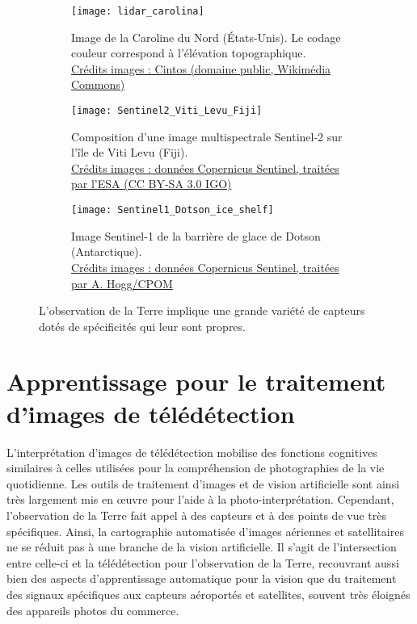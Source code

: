 \begin{figure}[h]
  \captionsetup[subfigure]{width=0.95\linewidth,justification=centering}
  \begin{subfigure}[t]{0.33\textwidth}
    \texttt{[image: lidar\_carolina]}
    \caption{Image  de la Caroline du Nord (États-Unis). Le codage couleur correspond à l'élévation topographique.\\
    \small \href{https://commons.wikimedia.org/wiki/File:Rex,_NC_LiDAR_DEM_of_Carolina_bays.jpg}{Crédits images : Cintos (domaine public, Wikimédia Commons)}
    }
  \end{subfigure}
  \begin{subfigure}[t]{0.33\textwidth}
    \texttt{[image: Sentinel2\_Viti\_Levu\_Fiji]}
    \caption{Composition  d'une image multispectrale Sentinel-2 sur l'île de Viti Levu (Fiji).\\
    \small \href{https://www.esa.int/spaceinimages/Images/2017/11/Viti_Levu_Fiji}{Crédits images : données Copernicus Sentinel, traitées par l'ESA (CC BY-SA 3.0 IGO)}
    }
  \end{subfigure}
  \begin{subfigure}[t]{0.33\textwidth}
    \texttt{[image: Sentinel1\_Dotson\_ice\_shelf]}
    \caption{Image  Sentinel-1 de la barrière de glace de Dotson (Antarctique).\\
    \small \href{https://www.esa.int/spaceinimages/Images/2017/10/Dotson_ice_shelf_from_Sentinel-1}{Crédits images : données Copernicus Sentinel, traitées par A. Hogg/CPOM}
    }
  \end{subfigure}
  \caption{L'observation de la Terre implique une grande variété de capteurs dotés de spécificités qui leur sont propres.}
  \label{fig:earth_observation}
\end{figure}

\section{Apprentissage pour le traitement d'images de télédétection}

L'interprétation d'images de télédétection mobilise des fonctions cognitives similaires à celles utilisées pour la compréhension de photographies de la vie quotidienne. Les outils de traitement d'images et de vision artificielle sont ainsi très largement mis en \oe{}uvre pour l'aide à la photo-interprétation. Cependant, l'observation de la Terre fait appel à des capteurs et à des points de vue très spécifiques. Ainsi, la cartographie automatisée d'images aériennes et satellitaires ne se réduit pas à une branche de la vision artificielle. Il s'agit de l'intersection entre celle-ci et la télédétection pour l'observation de la Terre, recouvrant aussi bien des aspects d'apprentissage automatique pour la vision que du traitement des signaux spécifiques aux capteurs aéroportés et satellites, souvent très éloignés des appareils photos du commerce.

